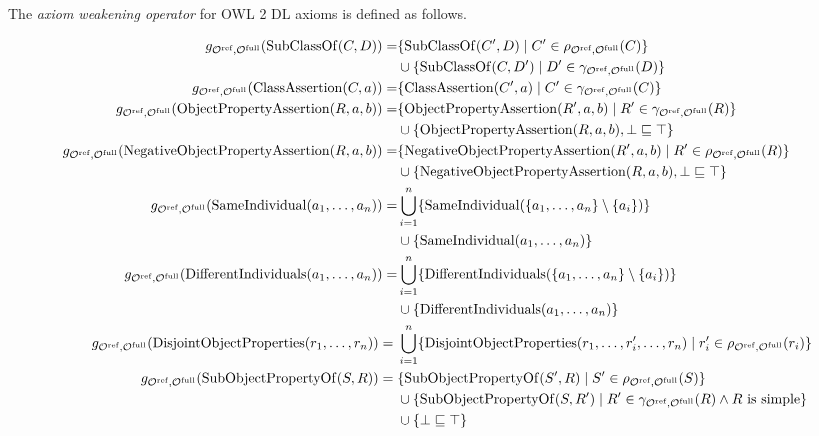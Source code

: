 \begin{definition}
  The \emph{axiom weakening operator} for OWL 2 DL axioms is defined as follows.
  \begin{widepage}
    \scriptsize
    \begin{align*}
      g_{\Omcref,\Omcfull}(\op{SubClassOf}(C, D)) = & \{\op{SubClassOf}(C', D) \mid C' \in \rho_{\Omcref,\Omcfull} (C)\} \\& \cup \{\op{SubClassOf}(C, D') \mid D' \in \gamma_{\Omcref,\Omcfull} (D)\} \\
      g_{\Omcref,\Omcfull}(\op{ClassAssertion}(C, a)) = & \{\op{ClassAssertion}(C', a) \mid C' \in \gamma_{\Omcref,\Omcfull} (C)\} \\
      g_{\Omcref,\Omcfull}(\op{ObjectPropertyAssertion}(R, a, b)) = & \{\op{ObjectPropertyAssertion}(R', a, b) \mid R' \in \gamma_{\Omcref,\Omcfull} (R)\} \\& \cup \{ \op{ObjectPropertyAssertion}(R, a, b), \bot \sqsubseteq \top \} \\
      g_{\Omcref,\Omcfull}(\op{NegativeObjectPropertyAssertion}(R, a, b)) = & \{\op{NegativeObjectPropertyAssertion}(R', a, b) \mid R' \in \rho_{\Omcref,\Omcfull} (R)\} \\& \cup \{\op{NegativeObjectPropertyAssertion}(R, a, b), \bot \sqsubseteq \top \} \\
      g_{\Omcref,\Omcfull}(\op{SameIndividual}(a_1, \dots, a_n)) = & \bigcup_{i=1}^n \{ \op{SameIndividual}(\{a_1, \dots, a_n\} \setminus \{a_i\}) \} \\& \cup \{ \op{SameIndividual}(a_1, \dots, a_n)\} \\
      g_{\Omcref,\Omcfull}(\op{DifferentIndividuals}(a_1, \dots, a_n)) = & \bigcup_{i=1}^n \{ \op{DifferentIndividuals}(\{a_1, \dots, a_n\} \setminus \{a_i\}) \} \\& \cup \{ \op{DifferentIndividuals}(a_1, \dots, a_n)\} \\
      g_{\Omcref,\Omcfull}(\op{DisjointObjectProperties}(r_1, \dots, r_n)) ={} & \bigcup_{i=1}^n \{ \op{DisjointObjectProperties}(r_1, \dots, r_i', \dots, r_n) \mid r_i' \in \rho_{\Omcref,\Omcfull}(r_i) \} \\
      g_{\Omcref,\Omcfull}(\op{SubObjectPropertyOf}(S, R)) ={} & \{\op{SubObjectPropertyOf}(S', R) \mid S' \in \rho_{\Omcref,\Omcfull} (S)\} \\& \cup \{\op{SubObjectPropertyOf}(S, R') \mid R' \in \gamma_{\Omcref,\Omcfull} (R) \land R \text{ is simple}\} \\& \cup \{ \bot \sqsubseteq \top \} \\

\end{align*}
\end{widepage}
\end{definition}
